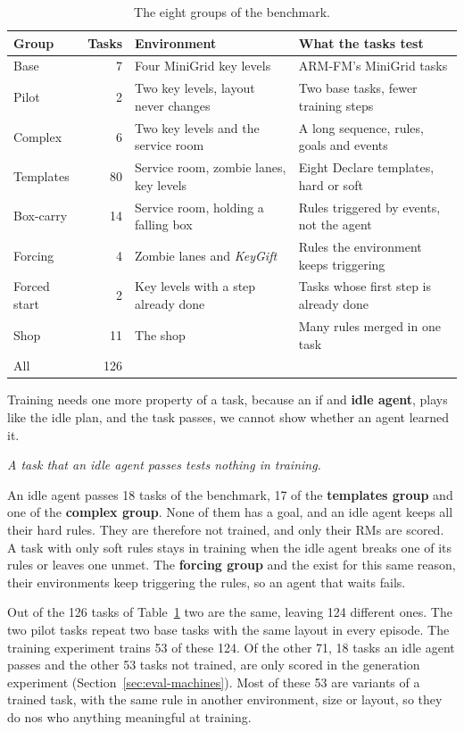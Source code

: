 \documentclass[11pt,english,listoffigures,listoftables]{tfgetsinf}
\newcommand{\env}[1]{\textsf{\slshape #1}}  %
\newcommand{\keyidea}[1]{\par\smallskip\noindent\hspace*{0.6em}{\color{gray!55}\vrule width 1.5pt}\hspace{8pt}\parbox[t]{\dimexpr\linewidth-0.6em-9.5pt\relax}{\itshape #1}\par\smallskip}  %
\begin{document}
\begin{table}[H]
\centering
\footnotesize
\renewcommand{\arraystretch}{1.2}
\begin{tabularx}{\textwidth}{@{}lr>{\raggedright\arraybackslash}X>{\raggedright\arraybackslash}X@{}}
\toprule
\textbf{Group} & \textbf{Tasks} & \textbf{Environment} & \textbf{What the tasks test} \\ \midrule
Base & 7 & Four MiniGrid key levels & ARM-FM's MiniGrid tasks \\
Pilot & 2 & Two key levels, layout never changes & Two base tasks, fewer training steps \\
Complex & 6 & Two key levels and the service room & A long sequence, rules, goals and events \\
Templates & 80 & Service room, zombie lanes, key levels & Eight Declare templates, hard or soft \\
Box-carry & 14 & Service room, holding a falling box & Rules triggered by events, not the agent \\
Forcing & 4 & Zombie lanes and \env{KeyGift} & Rules the environment keeps triggering \\
Forced start & 2 & Key levels with a step already done & Tasks whose first step is already done \\
Shop & 11 & The shop & Many rules merged in one task \\ \midrule
All & 126 & & \\ \bottomrule
\end{tabularx}
\caption{The eight groups of the benchmark.}
\label{tab:eval-suites}
\end{table}

Training needs one more property of a task, because an if and \textbf{idle agent}, plays like the idle plan, and the task passes, we cannot show whether an agent learned it. 

\keyidea{A task that an idle agent passes tests nothing in training.}

An idle agent passes 18 tasks of the benchmark, 17 of the \textbf{templates group} and one of the \textbf{complex group}. None of them has a goal, and an idle agent keeps all their hard rules. They are therefore not trained, and only their RMs are scored. A task with only soft rules stays in training when the idle agent breaks one of its rules or leaves one unmet. The \textbf{forcing group} and the  exist for this same reason, their environments keep triggering the rules, so an agent that waits fails.

Out of the 126 tasks of Table~\ref{tab:eval-suites} two are the same, leaving 124 different ones. The two pilot tasks repeat two base tasks with the same layout in every episode. The training experiment trains 53 of these 124. Of the other 71, 18 tasks an idle agent passes and the other 53 tasks not trained, are only scored in the generation experiment (Section~\ref{sec:eval-machines}). Most of these 53 are variants of a trained task, with the same rule in another environment, size or layout, so they do nos who anything meaningful at training.
\end{document}
